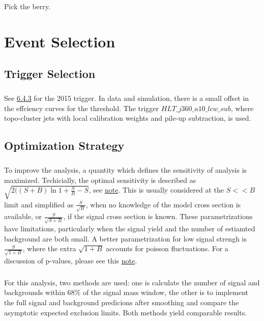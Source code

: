 \begin{savequote}[75mm]
Pick the berry.
\end{savequote}

\chapter{Event Selection}



\section{Trigger Selection}
\paragraph{}
See \href{https://arxiv.org/pdf/1611.09661.pdf}{6.4.3} for the 2015 trigger. In data and simulation, there is a small offset in the effciency curves for the threshold. The trigger $HLT\_j360\_a10\_lcw\_sub$, where topo-cluster jets with local calibration weights and pile-up subtraction, is used.


\section{Optimization Strategy}
\paragraph{}
To improve the analysis, a quantity which defines the sensitivity of analysis is maximized. Techicially, the optimal sensitivity is described as $\sqrt{2((S+B)\ln{1 + \frac{S}{B}} - S}$, see \href{https://www.pp.rhul.ac.uk/~cowan/stat/notes/SigCalcNote.pdf}{note}. This is usually considered at the $S << B$ limit and simplified as $\frac{S}{\sqrt{B}}$, when no knowledge of the model cross section is available, or $\frac{S}{\sqrt{S + B}}$, if the signal cross section is known. These parametrizations have limitations, particularly when the signal yield and the number of estiamted background are both small. A better parametrization for low signal strengh is $\frac{S}{\sqrt{1 + B}}$, where the extra $\sqrt{1 + B}$ accounts for poisson fluctuations. For a discussion of p-values, please see this \href{https://arxiv.org/pdf/hep-ex/0208005.pdf}{note}.

\paragraph{}
For this analysis, two methods are used: one is calculate the number of signal and backgrounds within $68\%$ of the signal \mhh mass window, the other is to implement the full signal and background predicions after smoothing and compare the asymptotic expected exclusion limits. Both methods yield comparable results.

